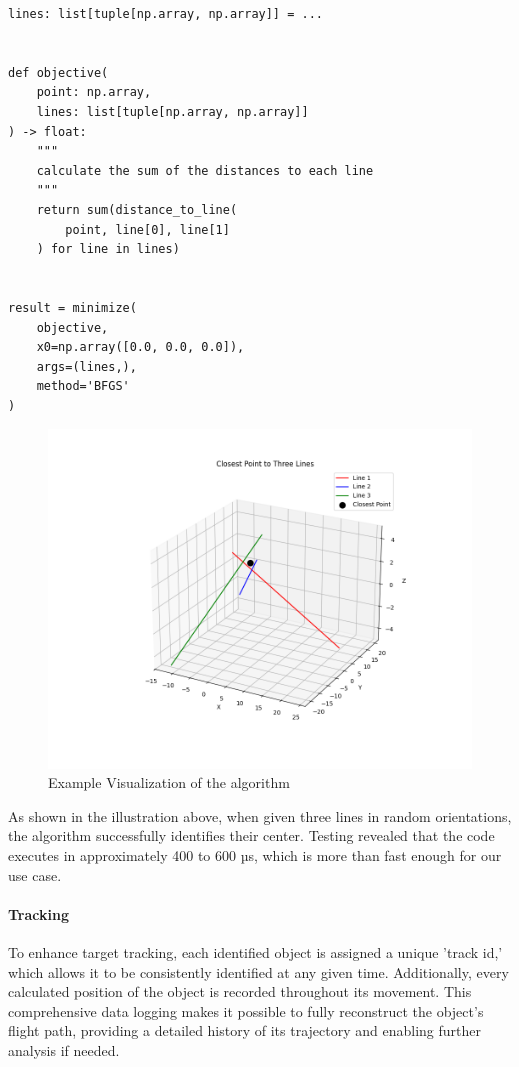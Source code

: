 \hspace*{-1.2cm}

\begin{lstlisting}[caption={Example of 3D Angle Calculation}, label={lst:exampleCalculation}, style=PythonStyle]
lines: list[tuple[np.array, np.array]] = ...


def objective(
	point: np.array,
	lines: list[tuple[np.array, np.array]]
) -> float:
	"""
	calculate the sum of the distances to each line
	"""
	return sum(distance_to_line(
		point, line[0], line[1]
	) for line in lines)


result = minimize(
	objective,
	x0=np.array([0.0, 0.0, 0.0]),
	args=(lines,),
	method='BFGS'
)
\end{lstlisting}

\begin{figure}[H]
	\centering
	\hspace*{-1.5cm} 
	\includegraphics[width=400pt]{figures/approximation_algorithm}
	\caption{Example Visualization of the algorithm}
	\label{fig:approximationalgorithm}
\end{figure}

As shown in the illustration above, when given three lines in random orientations, the algorithm successfully identifies their center. Testing revealed that the code executes in approximately 400 to 600 µs, which is more than fast enough for our use case.

\paragraph{Tracking}
To enhance target tracking, each identified object is assigned a unique 'track \acrshort{id},' which allows it to be consistently identified at any given time. Additionally, every calculated position of the object is recorded throughout its movement. This comprehensive data logging makes it possible to fully reconstruct the object's flight path, providing a detailed history of its trajectory and enabling further analysis if needed.

